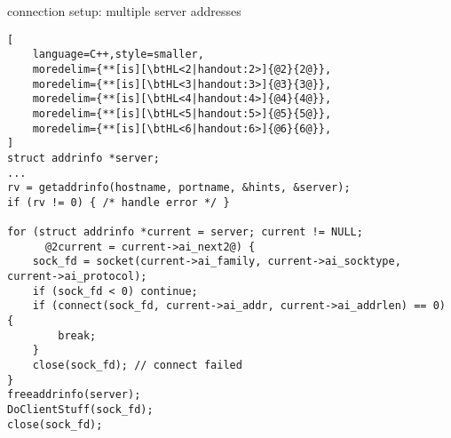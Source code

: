 \begin{frame}[fragile,label=serverLookupClientMulti]{connection setup: multiple server addresses}
\begin{lstlisting}[
    language=C++,style=smaller,
    moredelim={**[is][\btHL<2|handout:2>]{@2}{2@}},
    moredelim={**[is][\btHL<3|handout:3>]{@3}{3@}},
    moredelim={**[is][\btHL<4|handout:4>]{@4}{4@}},
    moredelim={**[is][\btHL<5|handout:5>]{@5}{5@}},
    moredelim={**[is][\btHL<6|handout:6>]{@6}{6@}},
]
struct addrinfo *server;
...
rv = getaddrinfo(hostname, portname, &hints, &server);
if (rv != 0) { /* handle error */ }

for (struct addrinfo *current = server; current != NULL;
      @2current = current->ai_next2@) {
    sock_fd = socket(current->ai_family, current->ai_socktype, current->ai_protocol);
    if (sock_fd < 0) continue;
    if (connect(sock_fd, current->ai_addr, current->ai_addrlen) == 0) {
        break;
    }
    close(sock_fd); // connect failed
}
freeaddrinfo(server);
DoClientStuff(sock_fd);
close(sock_fd);
\end{lstlisting}
\end{frame}
